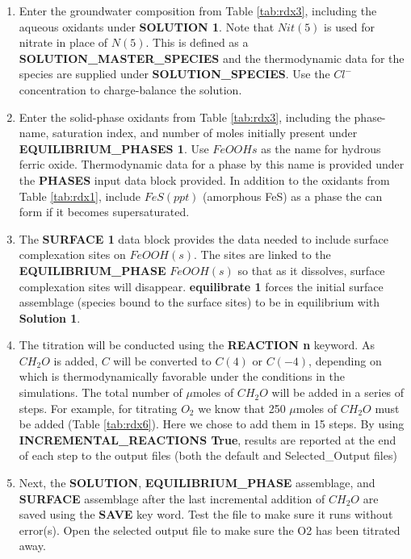\begin{enumerate}
\item Enter the groundwater composition from Table \ref{tab:rdx3}, 
including the aqueous oxidants under {\color{red} \textbf{SOLUTION 1}}.  
Note that $Nit(5)$ is used for nitrate in place of $N(5)$.  
This is defined as a {\color{red} \textbf{SOLUTION\_MASTER\_SPECIES}} and the thermodynamic 
data for the species are supplied under {\color{red} \textbf{SOLUTION\_SPECIES}}.  
Use the $Cl^-$ concentration to charge-balance the solution.

\item Enter the solid-phase oxidants from Table \ref{tab:rdx3}, 
including the phase-name, saturation index, and number of moles initially present 
under {\color{red} \textbf{EQUILIBRIUM\_PHASES 1}}.  
Use $FeOOHs$ as the name for hydrous ferric oxide.  
Thermodynamic data for a phase by this name is provided 
under the {\color{red} \textbf{PHASES}} input data block provided.  
In addition to the oxidants from Table \ref{tab:rdx1}, include $FeS(ppt)$ (amorphous FeS) 
as a phase the can form if it becomes supersaturated.

\item The {\color{red} \textbf{SURFACE 1}} data block provides 
the data needed to include surface complexation sites on $FeOOH(s)$.  
The sites are linked to the {\color{red} \textbf{EQUILIBRIUM\_PHASE}} $FeOOH(s)$ 
so that as it dissolves, surface complexation sites will disappear.  
{\color{red} \textbf{equilibrate 1}} forces the initial surface assemblage 
(species bound to the surface sites) to be in equilibrium with {\color{red} \textbf{Solution 1}}.

\item The titration will be conducted using the {\color{red} \textbf{REACTION n}} keyword.  
As $CH_2O$ is added, $C$ will be converted to $C(4)$ or $C(-4)$, 
depending on which is thermodynamically favorable under the conditions in the simulations.  
The total number of $\mu$moles of $CH_2O$ will be added in a series of steps.  
For example, for titrating $O_2$ we know that 250 $\mu$moles 
of $CH_2O$ must be added (Table \ref{tab:rdx6}).  
Here we chose to add them in 15 steps.  
By using {\color{red} \textbf{INCREMENTAL\_REACTIONS True}}, 
results are reported at the end of each step to the output files 
(both the default and Selected\_Output files)
 
\item Next, the {\color{red} \textbf{SOLUTION}}, 
{\color{red} \textbf{EQUILIBRIUM\_PHASE}} assemblage, and {\color{red} \textbf{SURFACE}} 
assemblage after the last incremental addition of $CH_2O$ are saved using 
the {\color{red} \textbf{SAVE}} key word.  
Test the file to make sure it runs without error(s).  
Open the selected output file to make sure the O2 has been titrated away.


\end{enumerate}
